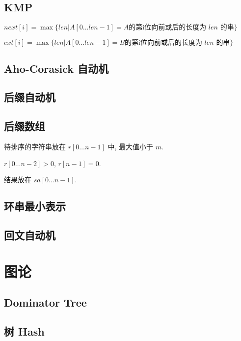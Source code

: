 \documentclass[landscape, twocolumn, 8pt, a4paper, twoside]{extarticle}
\begin{document}
\begin{spacing}{0.1}
\subsection{KMP}
$next[i] = \max\{len | A[0 \ldots len - 1] = A \textrm{的第i位向前或后的长度为 $len$ 的串} \}$

$ext[i] = \max\{len | A[0 \ldots len - 1] = B \textrm{的第i位向前或后的长度为 $len$ 的串} \}$


\subsection{Aho-Corasick 自动机}


\subsection{后缀自动机}


\subsection{后缀数组}
待排序的字符串放在 $r[0 \ldots n - 1]$ 中, 最大值小于 $m$.

$r[0 \ldots n - 2] > 0$, $r[n - 1] = 0$.

结果放在 $sa[0 \ldots n - 1]$.


\subsection{环串最小表示}

\subsection{回文自动机}


\section{图论}
\subsection{Dominator Tree}


\subsection{树 Hash}



\end{spacing}
\end{document}
